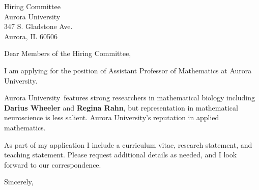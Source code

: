 \documentclass[11pt,a4paper]{letter}
\begin{document}
\def\School{Aurora University}
\begin{letter}
{Hiring Committee\\
Aurora University\\
347 S. Gladstone Ave.\\
Aurora, IL 60506}


\opening{Dear Members of the Hiring Committee,}

I am applying for the position of Assistant Professor of Mathematics at \School. 



\School~features strong researchers in mathematical biology including \textbf{Darius Wheeler} and \textbf{Regina Rahn}, but representation in mathematical neuroscience is less salient. \School's reputation in applied mathematics.



As part of my application I include a curriculum vitae, research statement, and teaching statement. Please request additional details as needed, and I look forward to our correspondence.

\closing{Sincerely,}
\end{letter}
\end{document}
